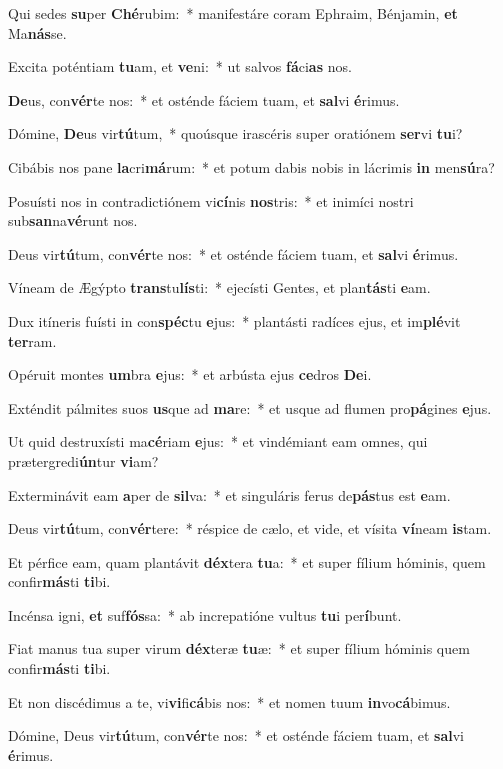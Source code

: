 \item Qui sedes \textbf{su}per \textbf{Ché}rubim:~* manifestáre coram Ephraim, Bénjamin, \textbf{et} Ma\textbf{nás}se.
\item Excita poténtiam \textbf{tu}am, et \textbf{ve}ni:~* ut salvos \textbf{fá}ci\textbf{as} nos.
\item \textbf{De}us, con\textbf{vér}te nos:~* et osténde fáciem tuam, et \textbf{sal}vi \textbf{é}rimus.
\item Dómine, \textbf{De}us vir\textbf{tú}tum,~* quoúsque irascéris super oratiónem \textbf{ser}vi \textbf{tu}i?
\item Cibábis nos pane \textbf{la}cri\textbf{má}rum:~* et potum dabis nobis in lácrimis \textbf{in} men\textbf{sú}ra?
\item Posuísti nos in contradictiónem vi\textbf{cí}nis \textbf{nos}tris:~* et inimíci nostri sub\textbf{san}na\textbf{vé}runt nos.
\item Deus vir\textbf{tú}tum, con\textbf{vér}te nos:~* et osténde fáciem tuam, et \textbf{sal}vi \textbf{é}rimus.
\item Víneam de Ægýpto \textbf{trans}tu\textbf{lís}ti:~* ejecísti Gentes, et plan\textbf{tás}ti \textbf{e}am.
\item Dux itíneris fuísti in con\textbf{spéc}tu \textbf{e}jus:~* plantásti radíces ejus, et im\textbf{plé}vit \textbf{ter}ram.
\item Opéruit montes \textbf{um}bra \textbf{e}jus:~* et arbústa ejus \textbf{ce}dros \textbf{De}i.
\item Exténdit pálmites suos \textbf{us}que ad \textbf{ma}re:~* et usque ad flumen pro\textbf{pá}gines \textbf{e}jus.
\item Ut quid destruxísti ma\textbf{cé}riam \textbf{e}jus:~* et vindémiant eam omnes, qui prætergredi\textbf{ún}tur \textbf{vi}am?
\item Exterminávit eam \textbf{a}per de \textbf{sil}va:~* et singuláris ferus de\textbf{pás}tus est \textbf{e}am.
\item Deus vir\textbf{tú}tum, con\textbf{vér}tere:~* réspice de cælo, et vide, et vísita \textbf{ví}neam \textbf{is}tam.
\item Et pérfice eam, quam plantávit \textbf{déx}tera \textbf{tu}a:~* et super fílium hóminis, quem confir\textbf{más}ti \textbf{ti}bi.
\item Incénsa igni, \textbf{et} suf\textbf{fós}sa:~* ab increpatióne vultus \textbf{tu}i per\textbf{í}bunt.
\item Fiat manus tua super virum \textbf{déx}teræ \textbf{tu}æ:~* et super fílium hóminis quem confir\textbf{más}ti \textbf{ti}bi.
\item Et non discédimus a te, vi\textbf{vi}fi\textbf{cá}bis nos:~* et nomen tuum \textbf{in}vo\textbf{cá}bimus.
\item Dómine, Deus vir\textbf{tú}tum, con\textbf{vér}te nos:~* et osténde fáciem tuam, et \textbf{sal}vi \textbf{é}rimus.
